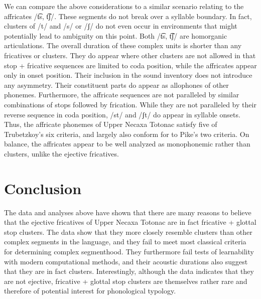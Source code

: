\documentclass[output=paper,colorlinks,citecolor=brown]{langscibook}
\begin{document}
We can compare the above considerations to a similar scenario relating to the affricates {/t͡s, t͡ʃ/}. These segments do not break over a syllable boundary. In fact, clusters of {/t/} and {/s/} or /ʃ/ do not even occur in environments that might potentially lead to ambiguity on this point. Both {/t͡s, t͡ʃ/} are homorganic articulations. The overall duration of these complex units is shorter than any fricatives or clusters. They do appear where other clusters are not allowed in that stop + fricative sequences are limited to coda position, while the affricates appear only in onset position. Their inclusion in the sound inventory does not introduce any asymmetry. Their constituent parts do appear as allophones of other phonemes. Furthermore, the affricate sequences are not paralleled by similar combinations of stops followed by frication. While they are not paralleled by their reverse sequence in coda position, {/st/} and {/ʃt/} do appear in syllable onsets. Thus, the affricate phonemes of Upper Necaxa Totonac satisfy five of Trubetzkoy's six criteria, and largely also conform for to Pike's two criteria. On balance, the affricates appear to be well analyzed as monophonemic rather than clusters, unlike the ejective fricatives.

\section{Conclusion}
The data and analyses above have shown that there are many reasons to believe that the ejective fricatives of Upper Necaxa Totonac are in fact fricative + glottal stop clusters. The data show that they more closely resemble clusters than other complex segments in the language, and they fail to meet most classical criteria for determining complex segmenthood. They furthermore fail tests of learnability with modern computational methods, and their acoustic durations also suggest that they are in fact clusters. Interestingly, although the data indicates that they are not ejective, fricative + glottal stop clusters are themselves rather rare and therefore of potential interest for phonological typology. 
\end{document}
